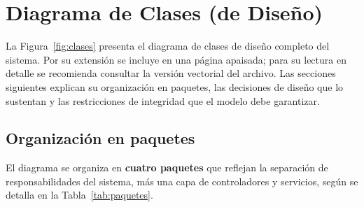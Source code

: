 \chapter{Diagrama de Clases (de Diseño)}
\label{cap:clases}

La Figura~\ref{fig:clases} presenta el diagrama de clases de diseño completo del sistema. Por su
extensión se incluye en una página apaisada; para su lectura en detalle se recomienda consultar la
versión vectorial del archivo. Las secciones siguientes explican su organización en paquetes, las
decisiones de diseño que lo sustentan y las restricciones de integridad que el modelo debe
garantizar.


\section{Organización en paquetes}
\label{sec:paquetes}

El diagrama se organiza en \textbf{cuatro paquetes} que reflejan la separación de
responsabilidades del sistema, más una capa de controladores y servicios, según se detalla en la
Tabla~\ref{tab:paquetes}.

